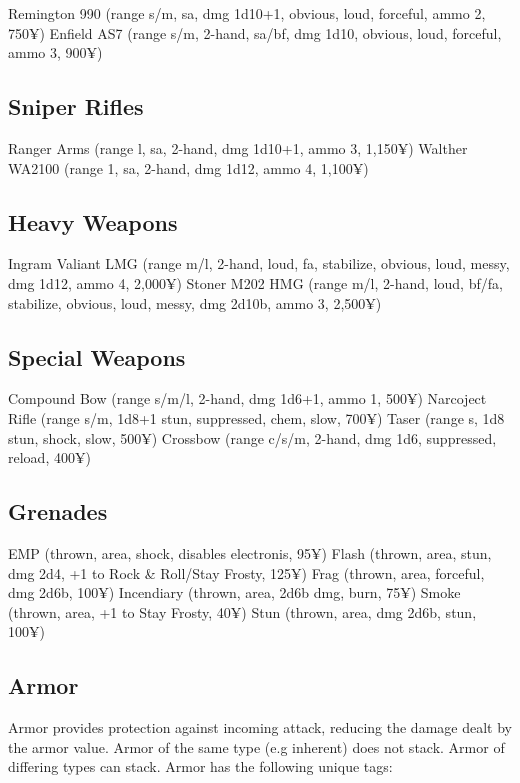Remington 990 (range s/m, sa, dmg 1d10+1, obvious, loud, forceful, ammo 2, 750¥)
Enfield AS7 (range s/m, 2-hand, sa/bf, dmg 1d10, obvious, loud, forceful, ammo 3, 900¥)


\subsection{Sniper Rifles}

Ranger Arms (range l, sa, 2-hand, dmg 1d10+1, ammo 3, 1,150¥)
Walther WA2100 (range 1, sa, 2-hand, dmg 1d12, ammo 4, 1,100¥)


\subsection{Heavy Weapons}

Ingram Valiant LMG (range m/l, 2-hand, loud, fa, stabilize, obvious, loud, messy, dmg 1d12, ammo 4, 2,000¥)
Stoner M202 HMG (range m/l, 2-hand, loud, bf/fa, stabilize, obvious, loud, messy, dmg 2d10b, ammo 3, 2,500¥)


\subsection{Special Weapons}

Compound Bow (range s/m/l, 2-hand, dmg 1d6+1, ammo 1, 500¥)
Narcoject Rifle (range s/m, 1d8+1 stun, suppressed, chem, slow, 700¥)
Taser (range s, 1d8 stun, shock, slow, 500¥)
Crossbow (range c/s/m, 2-hand, dmg 1d6, suppressed, reload, 400¥)


\subsection{Grenades}

EMP (thrown, area, shock, disables electronis, 95¥)
Flash (thrown, area, stun, dmg 2d4, +1 to Rock \& Roll/Stay Frosty, 125¥)
Frag (thrown, area, forceful, dmg 2d6b, 100¥)
Incendiary (thrown, area, 2d6b dmg, burn, 75¥)
Smoke (thrown, area, +1 to Stay Frosty, 40¥)
Stun (thrown, area, dmg 2d6b, stun, 100¥)


\subsection{Armor}

Armor provides protection against incoming attack, reducing the damage dealt by the armor value. Armor of the same type (e.g inherent) does not stack. Armor of differing types can stack. Armor has the following unique tags:


